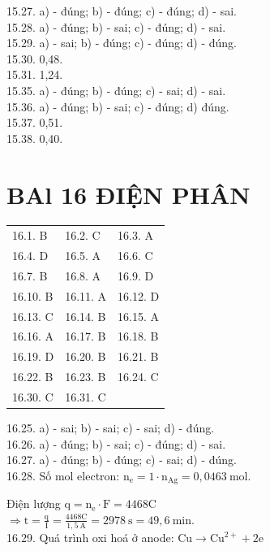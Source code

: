 \documentclass[10pt]{article}
\begin{document}
15.27. a) - đúng; b) - đúng; c) - đúng; d) - sai.\\
15.28. a) - đúng; b) - sai; c) - đúng; d) - sai.\\
15.29. a) - sai; b) - đúng; c) - đúng; d) - đúng.\\
15.30. 0,48.\\
15.31. 1,24.\\
15.35. a) - đúng; b) - đúng; c) - sai; d) - sai.\\
15.36. a) - đúng; b) - sai; c) - đúng; d) đúng.\\
15.37. 0,51.\\
15.38. 0,40.

\section*{BAl 16 ĐIỆN PHÂN}
\begin{center}
\begin{tabular}{lll}
16.1. B & 16.2. C & 16.3. A \\
16.4. D & 16.5. A & 16.6. C \\
16.7. B & 16.8. A & 16.9. D \\
16.10. B & 16.11. A & 16.12. D \\
16.13. C & 16.14. B & 16.15. A \\
16.16. A & 16.17. B & 16.18. B \\
16.19. D & 16.20. B & 16.21. B \\
16.22. B & 16.23. B & 16.24. C \\
16.30. C & 16.31. C &  \\
\end{tabular}
\end{center}

16.25. a) - sai; b) - sai; c) - sai; d) - đúng.\\
16.26. a) - đúng; b) - sai; c) - đúng; d) - sai.\\
16.27. a) - đúng; b) - đúng; c) - sai; d) - đúng.\\
16.28. Số mol electron: $\mathrm{n}_{\mathrm{e}}=1 \cdot \mathrm{n}_{\mathrm{Ag}}=0,0463 \mathrm{~mol}$.

Điện lượng $\mathrm{q}=\mathrm{n}_{\mathrm{e}} \cdot \mathrm{F}=4468 \mathrm{C}$\\
$\Rightarrow \mathrm{t}=\frac{\mathrm{q}}{\mathrm{I}}=\frac{4468 \mathrm{C}}{1,5 \mathrm{~A}}=2978 \mathrm{~s}=49,6 \mathrm{~min}$.\\
16.29. Quá trình oxi hoá ở anode: $\mathrm{Cu} \rightarrow \mathrm{Cu}^{2+}+2 \mathrm{e}$
\end{document}
